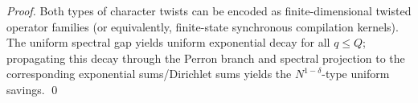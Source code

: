 \begin{proof}
Both types of character twists can be encoded as finite-dimensional twisted operator families (or equivalently, finite-state synchronous compilation kernels).
The uniform spectral gap yields uniform exponential decay for all \(q\le Q\); propagating this decay through the Perron branch and spectral projection to the corresponding exponential sums/Dirichlet sums yields the \(N^{1-\delta}\)-type uniform savings. \qed
\end{proof}

\endinput

